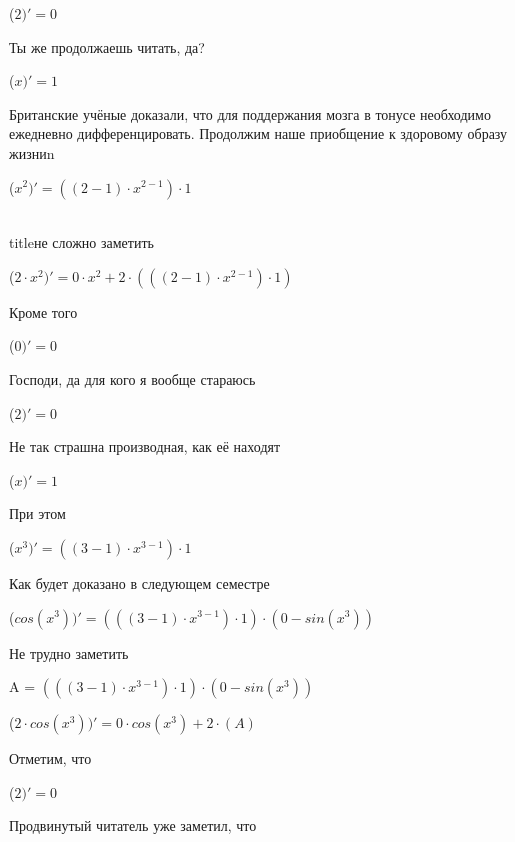 \documentclass[12pt,a4paper,fleqn]{article}
\begin{document}
\begin{center}
 ($2)'
  = 0$\end{center}
Ты же продолжаешь читать, да?

\begin{center}
 ($x)'
  = 1$\end{center}
Британские учёные доказали, что для поддержания мозга в тонусе необходимо ежедневно дифференцировать. Продолжим наше приобщение к здоровому образу жизниn

\begin{center}
 ($x^{2})'
  = ((2-1) \cdot x^{2-1}) \cdot 1$\end{center}
\\ title{не сложно заметить} 

\begin{center}
 ($2 \cdot x^{2})'
  = 0 \cdot x^{2}+2 \cdot (((2-1) \cdot x^{2-1}) \cdot 1)$\end{center}
Кроме того

\begin{center}
 ($0)'
  = 0$\end{center}
Господи, да для кого я вообще стараюсь

\begin{center}
 ($2)'
  = 0$\end{center}
Не так страшна производная, как её находят\cite{link2}

\begin{center}
 ($x)'
  = 1$\end{center}
При этом

\begin{center}
 ($x^{3})'
  = ((3-1) \cdot x^{3-1}) \cdot 1$\end{center}
Как будет доказано в следующем семестре

\begin{center}
 ($cos(x^{3}))'
  = (((3-1) \cdot x^{3-1}) \cdot 1) \cdot (0-sin(x^{3}))$\end{center}
Не трудно заметить

\begin{center}
A = $(((3-1) \cdot x^{3-1}) \cdot 1) \cdot (0-sin(x^{3}))$\end{center}
\begin{center}
 ($2 \cdot cos(x^{3}))'
  = 0 \cdot cos(x^{3})+2 \cdot (A)$\end{center}
Отметим, что

\begin{center}
 ($2)'
  = 0$\end{center}
Продвинутый читатель уже заметил, что
\end{document}
